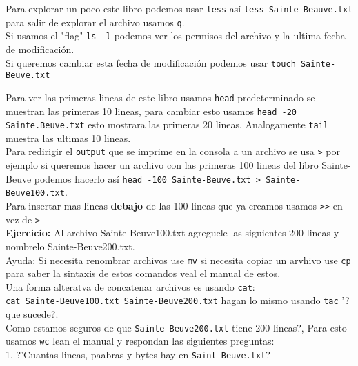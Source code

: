 \documentclass[12pt]{article}
\begin{document}
Para explorar un poco este libro podemos usar \verb+less+ as\'i \verb+less Sainte-Beauve.txt+ para salir de explorar el archivo usamos \verb+q+.\\

Si usamos el "flag" \verb+ls -l+ podemos ver los permisos del archivo y la ultima fecha de modificaci\'on.\\
Si queremos cambiar esta fecha de modificaci\'on podemos usar \verb+touch Sainte-Beuve.txt+

Para ver las primeras lineas de este libro usamos \verb+head+ predeterminado se muestran las primeras 10 lineas, 
para cambiar esto usamos \verb+head -20 Sainte.Beuve.txt+ esto mostrara las primeras 20 lineas. Analogamente 
\verb+tail+ muestra las ultimas 10 lineas.\\

Para redirigir el \verb+output+ que se imprime en la consola a un archivo se usa \verb+>+ por ejemplo si queremos
hacer un archivo con las primeras 100 lineas del libro Sainte-Beuve podemos hacerlo as\'i \verb+head -100 Sainte-Beuve.txt > Sainte-Beuve100.txt+.\\

Para insertar mas lineas \textbf{debajo} de las 100 lineas que ya creamos usamos \verb+>>+ en vez de \verb+>+\\ 

\textbf{Ejercicio:} Al archivo Sainte-Beuve100.txt agreguele las siguientes 200 lineas y nombrelo Sainte-Beuve200.txt.\\

Ayuda: Si necesita renombrar archivos use \verb+mv+ si necesita copiar un arvhivo use \verb+cp+ para saber la sintaxis 
de estos comandos veal el manual de estos.\\

Una forma alteratva de concatenar archivos es usando \verb+cat+:\\
\verb+cat Sainte-Beuve100.txt Sainte-Beuve200.txt+  hagan lo mismo usando \verb+tac+ '?que sucede?.\\

Como estamos seguros de que \verb+Sainte-Beuve200.txt+ tiene 200 lineas?, Para esto usamos \verb+wc+ lean 
el manual y respondan las siguientes preguntas:\\

1. ?'Cuantas lineas, paabras y bytes hay en \verb+Saint-Beuve.txt+?

\end{document}
